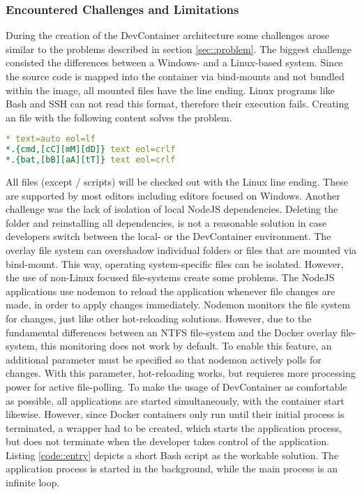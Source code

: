         \subsubsection{Encountered Challenges and Limitations}
        During the creation of the DevContainer architecture some challenges arose similar to the problems described in section \ref{sec::problem}. The biggest challenge consisted the differences between a Windows- and a Linux-based system. Since the source code is mapped into the container via bind-mounts and not bundled within the image, all mounted files have the  line ending. Linux programs like Bash and \ac{SSH} can not read this format, therefore their execution fails. Creating an  file with the following content solves the problem.
        \begin{lstlisting}[language=yml,frame=none, numbers=none, backgroundcolor=\color{codebg}]
* text=auto eol=lf
*.{cmd,[cC][mM][dD]} text eol=crlf
*.{bat,[bB][aA][tT]} text eol=crlf
        \end{lstlisting}
        \vspace{-0.5cm}
        All files (except / scripts) will be checked out with the Linux  line ending. These are supported by most editors including editors focused on Windows.\newline
        Another challenge was the lack of isolation of local NodeJS dependencies. Deleting the  folder and reinstalling all dependencies, is not a reasonable solution in case developers switch between the local- or the DevContainer environment. The overlay file system can overshadow individual folders or files that are mounted via bind-mount. This way, operating system-specific files can be isolated. However, the use of non-Linux focused file-systems create some problems. The NodeJS applications use nodemon to reload the application whenever file changes are made, in order to apply changes immediately. Nodemon monitors the file system for changes, just like other hot-reloading solutions. However, due to the fundamental differences between an NTFS file-system and the Docker overlay file-system, this monitoring does not work by default. To enable this feature, an additional parameter must be specified so that nodemon actively polls for changes. With this parameter, hot-reloading works, but requieres more processing power for active file-polling.\newline
        To make the usage of DevContainer as comfortable as possible, all applications are started simultaneously, with the container start likewise. However, since Docker containers only run until their initial process is terminated, a wrapper had to be created, which starts the application process, but does not terminate when the developer takes control of the application. Listing \ref{code::entry} depicts a short Bash script as the workable solution. The application process is started in the background, while the main process is an infinite loop. \newline
